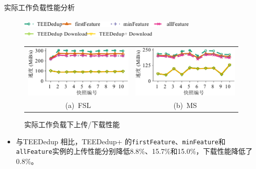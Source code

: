 \documentclass{beamer}
\newcommand{\sysnameS}{TEEDedup }
\newcommand{\prototype}{TEEDedup+ }
\begin{document}
\begin{frame}{实际工作负载性能分析}
    \begin{figure}[!htb]
        \centering
        \includegraphics[height=8pt]{../pic/featurespy/plot/performance/LANTrace/trace_legend_upload.pdf}\\
        \includegraphics[height=8pt]{../pic/featurespy/plot/performance/LANTrace/trace_legend_download.pdf}
        \vspace{5pt} \\
        \begin{tabular}{@{\ }c@{\ }c}
            \includegraphics[width=0.45\linewidth]{../pic/featurespy/plot/performance/LANTrace/trace_fsl.pdf} &
            \includegraphics[width=0.45\linewidth]{../pic/featurespy/plot/performance/LANTrace/trace_ms.pdf}    \\
            \mbox{\small (a) FSL}                                                                             &
            \mbox{\small (b)  MS}                                                                               \\
        \end{tabular}
        \caption{实际工作负载下上传/下载性能}
        \label{fig:featurespy-traceDrivenThroughput}
    \end{figure}

    \begin{itemize}
        \item 与\sysnameS 相比，\prototype 的{\tt firstFeature}、{\tt minFeature}和{\tt allFeature}实例的上传性能分别降低8.8\%、15.7\%和15.0\%，下载性能降低了0.8\%。
    \end{itemize}
\end{frame}
\end{document}
